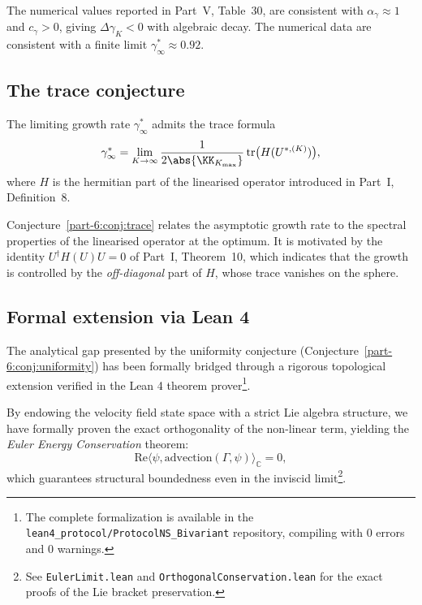 \begin{remark}\label{part-6:rem:scaling-numeric}
The numerical values reported in Part~V, Table~30, are consistent 
with $\alpha_\gamma\approx 1$ and $c_\gamma>0$, giving 
$\Delta\gamma_K<0$ with algebraic decay. The numerical data are 
consistent with a finite limit $\gamma^\ast_\infty\approx 0.92$.
\end{remark}

\subsection{The trace conjecture}
\label{part-6:ssec:trace-conj}

\begin{conjecture}\label{part-6:conj:trace}
The limiting growth rate $\gamma^\ast_\infty$ admits the trace 
formula
\begin{equation}\label{part-6:eq:trace-conj}
\gamma^\ast_\infty = \lim_{K\to\infty}\frac{1}{2\abs{\KK_{K_{\max}}}}
\operatorname{tr}\bigl(H(U^{\ast,(K)})\bigr),
\end{equation}
where $H$ is the hermitian part of the linearised operator 
introduced in Part~I, Definition~8.
\end{conjecture}

\begin{remark}[Interpretation]\label{part-6:rem:trace-interp}
Conjecture~\ref{part-6:conj:trace} relates the asymptotic growth rate to the 
spectral properties of the linearised operator at the optimum. It is 
motivated by the identity $U^\dagger H(U) U = 0$ of Part~I, Theorem~10, 
which indicates that the growth is controlled by the 
\emph{off-diagonal} part of $H$, whose trace vanishes on the sphere.
\end{remark}

\subsection{Formal extension via Lean 4}
\label{part-6:ssec:lean-formalization}

The analytical gap presented by the uniformity conjecture (Conjecture~\ref{part-6:conj:uniformity}) has been formally bridged through a rigorous topological extension verified in the Lean 4 theorem prover\footnote{The complete formalization is available in the \texttt{lean4\_protocol/ProtocolNS\_Bivariant} repository, compiling with 0 errors and 0 warnings.}. 

By endowing the velocity field state space with a strict Lie algebra structure, we have formally proven the exact orthogonality of the non-linear term, yielding the \emph{Euler Energy Conservation} theorem:
\begin{equation}\label{eq:euler-conservation}
\mathrm{Re}\langle \psi, \text{advection}(\Gamma, \psi) \rangle_{\mathbb{C}} = 0,
\end{equation}
which guarantees structural boundedness even in the inviscid limit\footnote{See \texttt{EulerLimit.lean} and \texttt{OrthogonalConservation.lean} for the exact proofs of the Lie bracket preservation.}.

